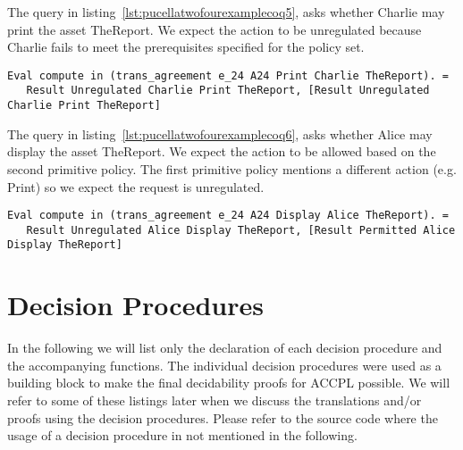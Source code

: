 The query in listing~\ref{lst:pucellatwofourexamplecoq5}, asks whether Charlie may print the asset TheReport. We expect the action to be unregulated because Charlie fails to meet the prerequisites specified for the policy set. 

\begin{minipage}[c]{0.95\textwidth}
\begin{lstlisting}
Eval compute in (trans_agreement e_24 A24 Print Charlie TheReport). = 
   Result Unregulated Charlie Print TheReport, [Result Unregulated Charlie Print TheReport]
\end{lstlisting}
\end{minipage} 

The query in listing~\ref{lst:pucellatwofourexamplecoq6}, asks whether Alice may display the asset TheReport. We expect the action to be allowed based on the second primitive policy. The first primitive policy mentions a different action (e.g. Print) so we expect the request is unregulated. 

\begin{minipage}[c]{0.95\textwidth}
\begin{lstlisting}
Eval compute in (trans_agreement e_24 A24 Display Alice TheReport). = 
   Result Unregulated Alice Display TheReport, [Result Permitted Alice Display TheReport]
\end{lstlisting}
\end{minipage} 






\section{Decision Procedures}\label{sec:decprocs}

In the following we will list only the declaration of each decision procedure and the accompanying functions. The individual decision procedures were used as a building block to make the final decidability proofs for \ac{ACCPL} possible. We will refer to some of these listings later when we discuss the translations and/or proofs using the decision procedures. Please refer to the source code where the usage of a decision procedure in not mentioned in the following.

